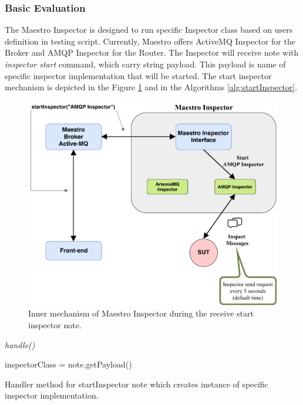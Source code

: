 \subsubsection*{Basic Evaluation}

The Maestro Inspector is designed to run specific Inspector class based on users definition in testing script. Currently, Maestro offers ActiveMQ Inspector for the Broker and AMQP Inspector for the Router. The Inspector will receive note with \emph{inspector start} command, which carry string payload. This payload is name of specific inspector implementation that will be started. The start inspector mechanism is depicted in the Figure \ref{fig:inspector_start} and in the Algorithms \ref{alg:startInspector}.

\begin{figure}[H]
  \centering
  \includegraphics[width=13cm]{obrazky-figures/inspector_start.pdf}
  \caption{Inner mechanism of Maestro Inspector during the receive start inspector note.}
  \label{fig:inspector_start}
\end{figure}

\begin{center}
	\begin{algorithm}[H]
		\LinesNumbered
		\DontPrintSemicolon


		\fce \emph{handle()}\;

		\var inspectorClass = note.getPayload()\;


		 \caption{Handler method for startInspector note which creates instance of specific inspector implementation.}
		 \label{alg:startInspector}
	\end{algorithm}
\end{center}

